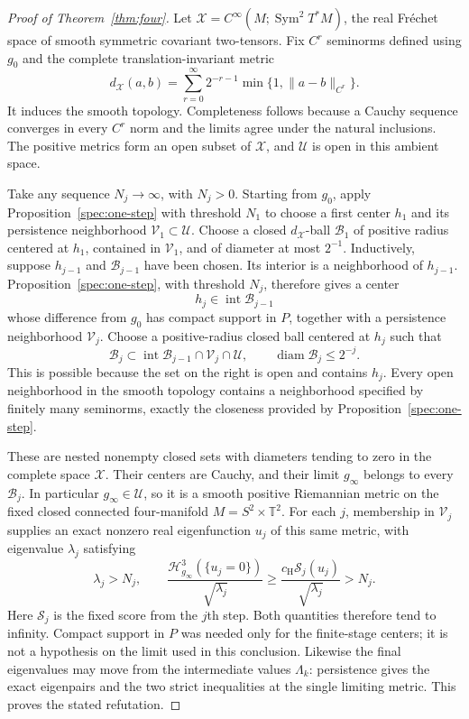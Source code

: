 \begin{proof}[Proof of Theorem~\ref{thm:four}]
Let $\mathcal X=C^\infty(M;\operatorname{Sym}^2T^*M)$, the real
Fr\'echet space of smooth symmetric covariant two-tensors.  Fix $C^r$
seminorms defined using $g_0$ and the complete translation-invariant metric
\[
 d_{\mathcal X}(a,b)
 =\sum_{r=0}^{\infty}2^{-r-1}
                 \min\{1,\|a-b\|_{C^r}\}.
\]
It induces the smooth topology.  Completeness follows because a Cauchy
sequence converges in every $C^r$ norm and the limits agree under the
natural inclusions.  The positive metrics form an open subset of
$\mathcal X$, and $\mathcal U$ is open in this ambient space.

Take any sequence $N_j\to\infty$, with $N_j>0$.  Starting from $g_0$,
apply Proposition~\ref{spec:one-step} with threshold $N_1$ to choose
a first center $h_1$ and
its persistence neighborhood $\mathcal V_1\subset\mathcal U$.
Choose a closed $d_{\mathcal X}$-ball $\mathcal B_1$ of positive radius
centered at $h_1$, contained in $\mathcal V_1$, and of diameter at most
$2^{-1}$.  Inductively, suppose $h_{j-1}$ and $\mathcal B_{j-1}$ have
been chosen.  Its interior is a neighborhood of $h_{j-1}$.
Proposition~\ref{spec:one-step}, with threshold $N_j$, therefore gives
a center
\[
 h_j\in\operatorname{int}\mathcal B_{j-1}
\]
whose difference from $g_0$ has compact support in $P$, together with a
persistence neighborhood $\mathcal V_j$.  Choose a positive-radius
closed ball centered at $h_j$ such that
\[
 \mathcal B_j\subset
 \operatorname{int}\mathcal B_{j-1}\cap\mathcal V_j\cap\mathcal U,
 \qquad \operatorname{diam}\mathcal B_j\le2^{-j}.
\]
This is possible because the set on the right is open and contains
$h_j$.  Every open neighborhood in the smooth topology contains a
neighborhood specified by finitely many seminorms, exactly the closeness
provided by Proposition~\ref{spec:one-step}.

These are nested nonempty closed sets with diameters tending to zero in
the complete space $\mathcal X$.  Their centers are Cauchy, and their
limit $g_\infty$ belongs to every $\mathcal B_j$.  In particular
$g_\infty\in\mathcal U$,
so it is a smooth positive Riemannian metric on the fixed closed connected
four-manifold $M=S^2\times\mathbb T^2$.  For each $j$, membership in
$\mathcal V_j$ supplies an exact nonzero real eigenfunction $u_j$ of this
same metric, with eigenvalue $\lambda_j$ satisfying
\[
 \lambda_j>N_j,\qquad
 \frac{\mathcal H_{g_\infty}^3(\{u_j=0\})}{\sqrt{\lambda_j}}
 \ge\frac{c_{\mathrm H}\mathcal S_j(u_j)}{\sqrt{\lambda_j}}>N_j.
\]
Here $\mathcal S_j$ is the fixed score from the $j$th step.
Both quantities therefore tend to infinity.  Compact support in $P$
was needed only for the finite-stage centers; it is not a hypothesis on
the limit used in this conclusion.  Likewise the final eigenvalues may
move from the intermediate values $\Lambda_k$: persistence gives the
exact eigenpairs and the two strict inequalities at the single limiting
metric.  This proves the stated refutation.
\end{proof}
